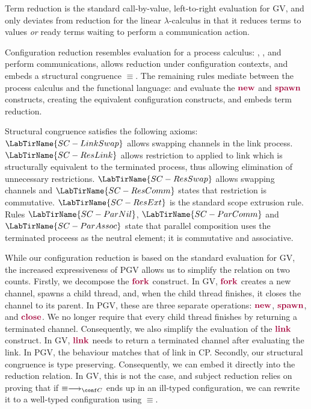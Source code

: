 \documentclass[main.tex]{subfiles}
\begin{document}
Term reduction is the standard call-by-value, left-to-right evaluation for GV, and only deviates from reduction for the linear $\lambda$-calculus in that it reduces terms to values \emph{or} ready terms waiting to perform a communication action.

Configuration reduction resembles evaluation for a process calculus: , , and  perform communications,  allows reduction under configuration contexts, and  embeds a structural congruence $\equiv$. The remaining rules mediate between the process calculus and the functional language:  and  evaluate the $\tm{\new}$ and $\tm{\spawn}$ constructs, creating the equivalent configuration constructs, and  embeds term reduction.

Structural congruence satisfies the following axioms: $\LabTirName{SC-LinkSwap}$ allows swapping channels in the link process. $\LabTirName{SC-ResLink}$ allows restriction to applied to link which is structurally equivalent to the terminated process, thus allowing elimination of unnecessary restrictions. $\LabTirName{SC-ResSwap}$ allows swapping channels and $\LabTirName{SC-ResComm}$ states that restriction is commutative. $\LabTirName{SC-ResExt}$ is the standard scope extrusion rule. Rules $\LabTirName{SC-ParNil}$, $\LabTirName{SC-ParComm}$ and $\LabTirName{SC-ParAssoc}$ state that parallel composition uses the terminated proceess as the neutral element; it is commutative and associative.

While our configuration reduction is based on the standard evaluation for GV, the increased expressiveness of PGV allows us to simplify the relation on two counts.
Firstly, we decompose the $\tm{\fork}$ construct. In GV, $\tm{\fork}$ creates a new channel, spawns a child thread, and, when the child thread finishes, it closes the channel to its parent. In PGV, these are three separate operations: $\tm{\new}$, $\tm{\spawn}$, and $\tm{\close}$. We no longer require that every child thread finishes by returning a terminated channel. Consequently, we also simplify the evaluation of the $\tm{\link}$ construct. In GV, $\tm{\link}$ needs to return a terminated channel after evaluating the link. In PGV, the behaviour matches that of link in CP.
Secondly, our structural congruence is type preserving. Consequently, we can embed it directly into the reduction relation. In GV, this is not the case, and subject reduction relies on proving that if $\equiv\cred$ ends up in an ill-typed configuration, we can rewrite it to a well-typed configuration using $\equiv$.
\end{document}
